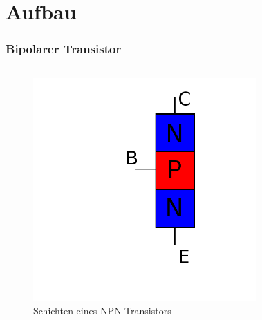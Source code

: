 

\subtitle{Technik Klasse A 06: \\
  Transistor \& Verstärker \\[2em]}
\date{Stand 04.05.2016}


\section*{Aufbau}

\begin{frame}
  \frametitle{Bipolarer Transistor}
  \begin{columns}
    \begin{figure}
      \includegraphics[width=\textwidth,height=.5\textheight,keepaspectratio]{a06/NPN_hlb.png}
      \caption{Schichten eines NPN-Transistors}
    \end{figure}
    \begin{figure}

\end{figure}
\end{columns}
\end{frame}
